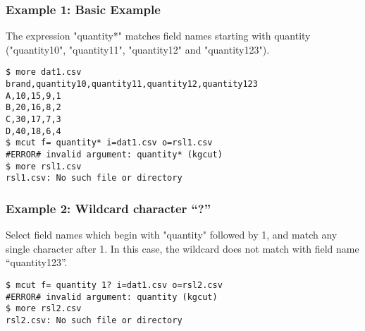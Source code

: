 \subsubsection*{Example 1: Basic Example}

The expression "quantity*" matches field names starting with quantity ("quantity10", "quantity11", "quantity12" and "quantity123").  


\begin{Verbatim}[baselinestretch=0.7,frame=single]
$ more dat1.csv
brand,quantity10,quantity11,quantity12,quantity123
A,10,15,9,1
B,20,16,8,2
C,30,17,7,3
D,40,18,6,4
$ mcut f= quantity* i=dat1.csv o=rsl1.csv
#ERROR# invalid argument: quantity* (kgcut)
$ more rsl1.csv
rsl1.csv: No such file or directory
\end{Verbatim}
\subsubsection*{Example 2: Wildcard character “?”}

Select field names which begin with "quantity" followed by 1, and match any single character after 1. In this case, the wildcard does not match with field name “quantity123”. 


\begin{Verbatim}[baselinestretch=0.7,frame=single]
$ mcut f= quantity 1? i=dat1.csv o=rsl2.csv
#ERROR# invalid argument: quantity (kgcut)
$ more rsl2.csv
rsl2.csv: No such file or directory
\end{Verbatim}
